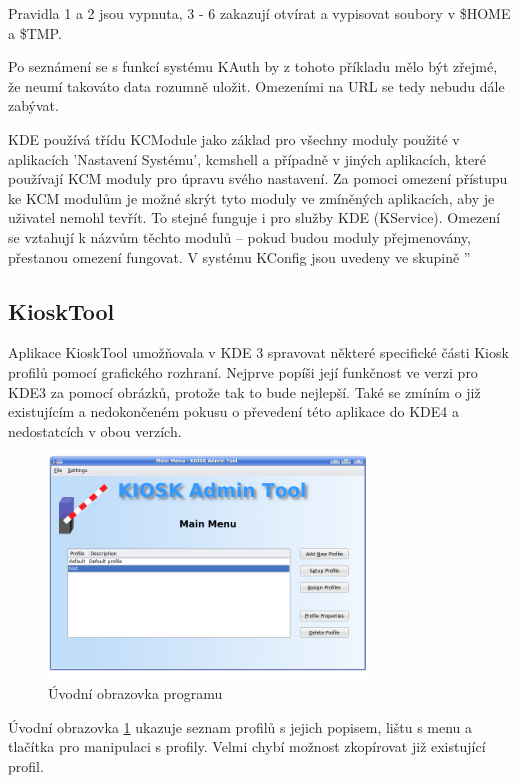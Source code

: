 Pravidla 1 a 2 jsou vypnuta, 3 - 6 zakazují otvírat a vypisovat soubory
v \$HOME a \$TMP.

Po seznámení se s funkcí systému KAuth by z tohoto příkladu mělo být zřejmé, že
neumí takováto data rozumně uložit. Omezeními na URL se tedy nebudu dále
zabývat.

KDE používá třídu KCModule jako základ pro všechny moduly použité v aplikacích
'Nastavení Systému', kcmshell a případně v jiných aplikacích, které používají
KCM moduly pro úpravu svého nastavení. Za pomoci omezení přístupu ke KCM modulům
je možné skrýt tyto moduly ve zmíněných aplikacích, aby je uživatel nemohl 
tevřít. To stejné funguje i pro služby KDE (KService). Omezení se vztahují
k názvům těchto modulů -- pokud budou moduly přejmenovány, přestanou omezení
fungovat. V systému KConfig jsou uvedeny ve skupině ''

\subsection{KioskTool}
Aplikace KioskTool umožňovala v KDE 3 spravovat některé specifické části Kiosk
profilů pomocí grafického rozhraní. Nejprve popíši její funkčnost ve verzi pro
KDE3 za pomocí obrázků, protože tak to bude nejlepší. Také se zmíním
o již existujícím a nedokončeném pokusu o převedení této aplikace do KDE4
a nedostatcích v obou verzích. 

\begin{figure}[h]
    \centering
    \includegraphics[width=8.5cm]{obrazky/KioskToolKDE3/uvodni_obrazovka.png}
    \caption{Úvodní obrazovka programu}
    \label{fig:kt3_uvodni}
\end{figure}
Úvodní obrazovka \ref{fig:kt3_uvodni} ukazuje seznam profilů s jejich popisem,
lištu s menu a tlačítka pro manipulaci s profily. Velmi chybí možnost zkopírovat
již existující profil.

